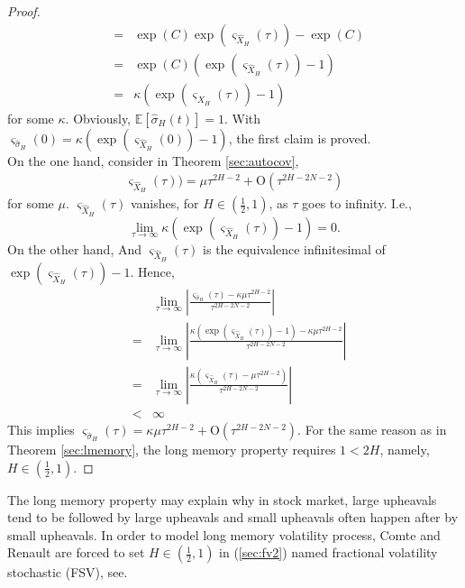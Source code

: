 \documentclass[a4paper, twoside, 11pt]{article}
\theoremstyle{definition}
\begin{document}
\begin{proof}
\begin{eqnarray*}
	&=& \exp(C) \exp(\varsigma_{\hat{X}_{H}}(\tau)) - \exp(C)\\
	&=& \exp(C)(\exp(\varsigma_{\hat{X}_{H}}(\tau)) - 1)\\
	&=& \kappa(\exp(\varsigma_{\hat{X}_{H}}(\tau)) - 1)
 \end{eqnarray*}
 for some $\kappa$. Obviously, $\mathbb{E}[\hat{\sigma}_{H}(t)]=1$. With $ \varsigma_{\hat{\sigma}_H}(0) = \kappa(\exp(\varsigma_{\hat{X}_{H}}(0)) - 1)$, the first claim is proved.\\
 On the one hand, consider in Theorem \ref{sec:autocov},
\begin{eqnarray*}
  \varsigma_{\hat{X}_{H}}(\tau)) = \mu \tau^{2H-2} + \mathrm{O}(\tau^{{2H-2N-2}})
\end{eqnarray*}
for some $\mu$.
 $\varsigma_{\hat{X}_{H}}(\tau)$ vanishes, for $H\in(\frac{1}{2}, 1)$, as $\tau$ goes to infinity. I.e.,
 $$
 \lim\limits_{\tau\rightarrow \infty}\kappa(\exp(\varsigma_{\hat{X}_{H}}(\tau)) - 1) = 0.
 $$
 On the other hand, 
And $\varsigma_{\hat{X}_{H}}(\tau)$ is the equivalence infinitesimal of $\exp(\varsigma_{\hat{X}_{H}}(\tau)) - 1$. Hence,
\begin{eqnarray*}
  &&  \lim\limits_{\tau\rightarrow \infty} |\frac{\varsigma_{\hat{\sigma}_H}(\tau) - \kappa \mu \tau^{2H-2}}{\tau^{{2H-2N-2}}}|\\
  &=& \lim\limits_{\tau\rightarrow \infty} |\frac{\kappa(\exp(\varsigma_{\hat{X}_{H}}(\tau)) - 1) - \kappa \mu \tau^{2H-2}}{\tau^{{2H-2N-2}}}|\\
  &=& \lim\limits_{\tau\rightarrow \infty} |\frac{\kappa(\varsigma_{\hat{X}_{H}}(\tau) - \mu\tau^{2H-2})}{\tau^{{2H-2N-2}}}|\\
  &<& \infty
\end{eqnarray*}
This implies $\varsigma_{\hat{\sigma}_H}(\tau) = \kappa\mu \tau^{2H-2} + \mathrm{O}(\tau^{{2H-2N-2}})$. For the same reason as in Theorem \ref{sec:lmemory}, the long memory property requires $1<2H$, namely, $H\in(\frac{1}{2}, 1)$.
\end{proof}

The long memory property may explain why in stock market, large upheavals tend to be followed by large upheavals and small upheavals often happen after by small upheavals.  In order to model long memory volatility process, Comte and Renault are forced to set $H\in (\frac{1}{2}, 1)$ in (\ref{sec:fv2}) named fractional volatility stochastic (FSV), see\cite{comren}. \\
\end{document}
